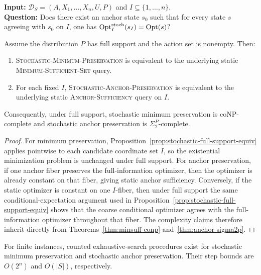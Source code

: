 \begin{problem}\label{prob:stochastic-anchor-preservation}
\textbf{Input:} $\mathcal{D}_S=(A,X_1,\ldots,X_n,U,P)$ and $I\subseteq\{1,\ldots,n\}$. \\
\textbf{Question:} Does there exist an anchor state $s_0$ such that for every state $s$ agreeing with $s_0$ on $I$, one has $\mathrm{Opt}^{\mathrm{stoch}}_I(s_I)=\mathrm{Opt}(s)$?
\end{problem}

\begin{theorem}\label{thm:stochastic-preservation-full-support-variants}
Assume the distribution $P$ has full support and the action set is nonempty.
Then:
\begin{enumerate}
\item \textsc{Stochastic-Minimum-Preservation} is equivalent to the underlying static \textsc{Minimum-Sufficient-Set} query.
\item For each fixed $I$, \textsc{Stochastic-Anchor-Preservation} is equivalent to the underlying static \textsc{Anchor-Sufficiency} query on $I$.
\end{enumerate}
Consequently, under full support, stochastic minimum preservation is coNP-complete and stochastic anchor preservation is $\Sigma_2^P$-complete.
\end{theorem}


\begin{proof}
For minimum preservation, Proposition~\ref{prop:stochastic-full-support-equiv} applies pointwise to each candidate coordinate set $I$, so the existential minimization problem is unchanged under full support. For anchor preservation, if one anchor fiber preserves the full-information optimizer, then the optimizer is already constant on that fiber, giving static anchor sufficiency. Conversely, if the static optimizer is constant on one $I$-fiber, then under full support the same conditional-expectation argument used in Proposition~\ref{prop:stochastic-full-support-equiv} shows that the coarse conditional optimizer agrees with the full-information optimizer throughout that fiber. The complexity claims therefore inherit directly from Theorems~\ref{thm:minsuff-conp} and~\ref{thm:anchor-sigma2p}.
\end{proof}

\begin{proposition}\label{prop:stochastic-preservation-variant-search}
For finite instances, counted exhaustive-search procedures exist for stochastic minimum preservation and stochastic anchor preservation. Their step bounds are $O(2^n)$ and $O(|S|)$, respectively.
\end{proposition}


